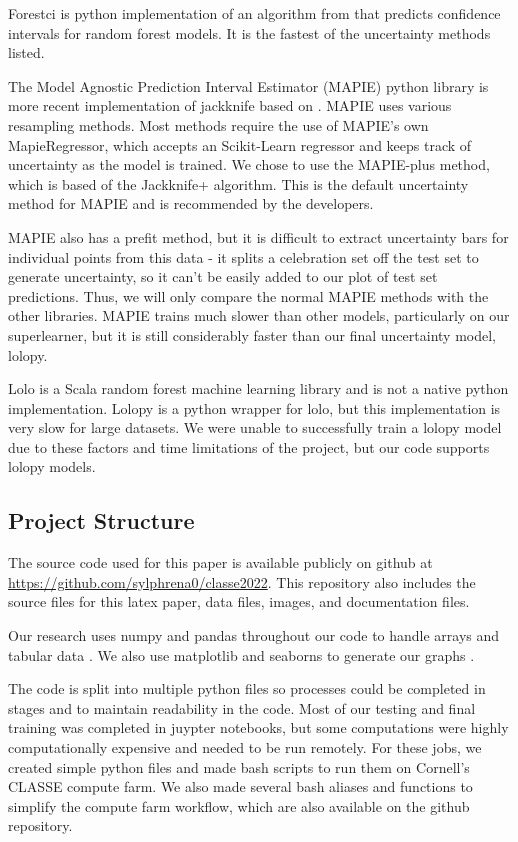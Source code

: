 \documentclass[twocolumn, nofootinbib, secnumarabic, amssymb, nobibnotes, aps, prd]{revtex4-2}
\begin{document}
Forestci is python implementation of an algorithm from \cite{Wager2014} that predicts confidence intervals for random forest models. It is the fastest of the uncertainty methods listed. 

The Model Agnostic Prediction Interval Estimator (MAPIE) python library is more recent implementation of jackknife based on \cite{Foygel2020}. MAPIE uses various resampling methods. Most methods require the use of MAPIE's own MapieRegressor, which accepts an Scikit-Learn regressor and keeps track of uncertainty as the model is trained. We chose to use the MAPIE-plus method, which is based of the Jackknife+ algorithm. This is the default uncertainty method for MAPIE and is recommended by the developers.

MAPIE also has a prefit method, but it is difficult to extract uncertainty bars for individual points from this data - it splits a celebration set off the test set to generate uncertainty, so it can't be easily added to our plot of test set predictions. Thus, we will only compare the normal MAPIE methods with the other libraries. MAPIE trains much slower than other models, particularly on our superlearner, but it is still considerably faster than our final uncertainty model, lolopy.

Lolo is a Scala random forest machine learning library and is not a native python implementation. Lolopy is a python wrapper for lolo, but this implementation is very slow for large datasets. We were unable to successfully train a lolopy model due to these factors and time limitations of the project, but our code supports lolopy models.

\subsection{Project Structure} %
The source code used for this paper is available publicly on github at \url{https://github.com/sylphrena0/classe2022}. This repository also includes the source files for this latex paper, data files, images, and documentation files.

Our research uses numpy and pandas throughout our code to handle arrays and tabular data \cite{Harris2020array, Reback2020pandas}. We also use matplotlib and seaborns to generate our graphs \cite{Hunter2007, Waskom2021}.

The code is split into multiple python files so processes could be completed in stages and to maintain readability in the code. Most of our testing and final training was completed in juypter notebooks, but some computations were highly computationally expensive and needed to be run remotely. For these jobs, we created simple python files and made bash scripts to run them on Cornell's CLASSE compute farm. We also made several bash aliases and functions to simplify the compute farm workflow, which are also available on the github repository. 
\end{document}
